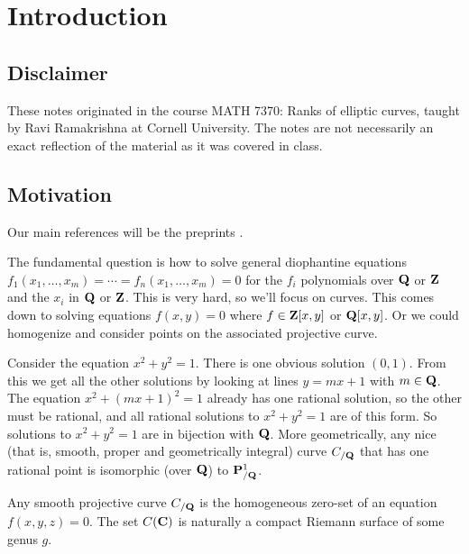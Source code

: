 
\section{Introduction}





\subsection{Disclaimer}

These notes originated in the course MATH 7370: Ranks of elliptic curves, 
taught by Ravi Ramakrishna at Cornell University. The notes are not necessarily 
an exact reflection of the material as it was covered in class. 





\subsection{Motivation}

Our main references will be the preprints 
\cite{
  bhargava-shankar-1,
  bhargava-shankar-2,
  bhargava-shankar-3,
  bhargava-shankar-4,
  bhargava-skinner,
  bhargava-skinner-zhang}. 

The fundamental question is how to solve general diophantine equations 
$f_1(x_1,\dots,x_m) = \cdots = f_n(x_1,\dots,x_m) = 0$ for the 
$f_i$ polynomials over $\mathbf{Q}$ or $\mathbf{Z}$ and the $x_i$ in $\mathbf{Q}$ or $\mathbf{Z}$. This is 
very hard, so we'll focus on curves. This comes down to solving equations 
$f(x,y)=0$ where $f\in \mathbf{Z}[x,y]$ or $\mathbf{Q}[x,y]$. Or we could homogenize and 
consider points on the associated projective curve. 

\begin{example}
Consider the equation $x^2+y^2=1$. There is one obvious solution $(0,1)$. From 
this we get all the other solutions by looking at lines $y=m x+1$ with 
$m\in \mathbf{Q}$. The equation $x^2+(m x+1)^2=1$ already has one rational solution, 
so the other must be rational, and all rational solutions to $x^2+y^2=1$ are of 
this form. So solutions to $x^2+y^2=1$ are in bijection with $\mathbf{Q}$. More 
geometrically, any nice (that is, smooth, proper and geometrically integral) 
curve $C_{/\mathbf{Q}}$ that has one rational point is isomorphic (over $\mathbf{Q}$) to 
$\mathbf{P}^1_{/\mathbf{Q}}$. 
\end{example}

Any smooth projective curve $C_{/\mathbf{Q}}$ is the homogeneous zero-set of an 
equation $f(x,y,z)=0$. The set $C(\mathbf{C})$ is naturally a compact Riemann surface 
of some genus $g$. 

